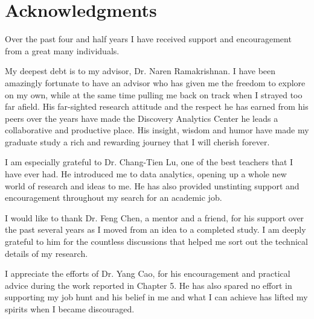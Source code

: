 \documentclass[12pt,dvips]{report}
\begin{document}
\vfill



\pagebreak


\chapter*{Acknowledgments}
Over the past four and half years I have received support and encouragement from a great many individuals.

My deepest debt is to my advisor, Dr. Naren Ramakrishnan. I have been amazingly fortunate to have an advisor who has given me the freedom to explore on my own, while at the same time pulling me back on track when I strayed too far afield. His far-sighted research attitude and the respect he has earned from his peers over the years have made the Discovery Analytics Center he leads a collaborative and productive place. His insight, wisdom and humor have made my graduate study a rich and rewarding journey that I will cherish forever.

I am especially grateful to Dr. Chang-Tien Lu, one of the best teachers that I have ever had. He introduced me to data analytics, opening up a whole new world of research and ideas to me. He has also provided unstinting support and encouragement throughout my search for an academic job.

I would like to thank Dr. Feng Chen, a mentor and a friend, for his support over the past several years as I moved from an idea to a completed study. I am deeply grateful to him for the countless discussions that helped me sort out the technical details of my research.

I appreciate the efforts of Dr. Yang Cao, for his encouragement and practical advice during the work reported in Chapter 5. He has also spared no effort in supporting my job hunt and his belief in me and what I can achieve has lifted my spirits when I became discouraged.
\end{document}
